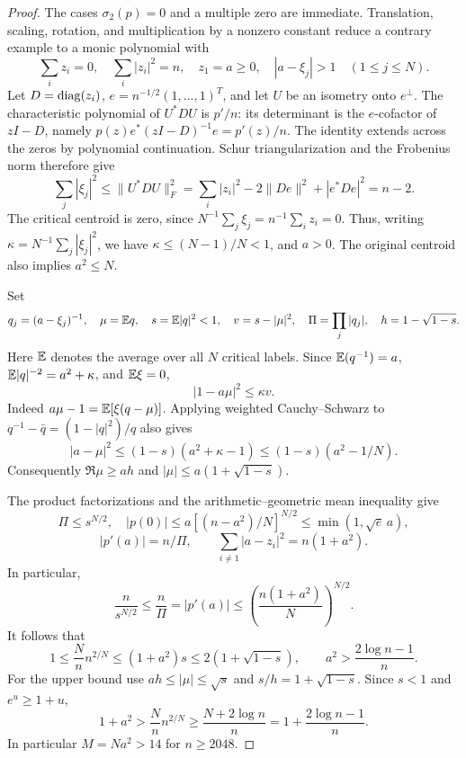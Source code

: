 \begin{proof}
The cases $\sigma_2(p)=0$ and a multiple zero are immediate.
Translation, scaling, rotation, and multiplication by a nonzero
constant reduce a contrary example to a monic polynomial with
\[
 \sum_i z_i=0,\quad \sum_i|z_i|^2=n,\quad z_1=a\ge0,
 \quad |a-\xi_j|>1\quad(1\le j\le N).
\]
Let $D=\operatorname{diag}(z_i)$, $e=n^{-1/2}(1,\ldots,1)^T$, and let $U$ be an
isometry onto $e^\perp$. The characteristic polynomial of $U^*DU$ is
$p'/n$: its determinant is the $e$-cofactor of $zI-D$, namely
$p(z)e^*(zI-D)^{-1}e=p'(z)/n$. The identity extends across the zeros
by polynomial continuation. Schur triangularization and the Frobenius
norm therefore give
\[
 \sum_j|\xi_j|^2\le\|U^*DU\|_F^2
 =\sum_i|z_i|^2-2\|De\|^2+|e^*De|^2=n-2.
\]
The critical centroid is zero, since
$N^{-1}\sum_j\xi_j=n^{-1}\sum_i z_i=0$. Thus, writing
$\kappa=N^{-1}\sum_j|\xi_j|^2$, we have
$\kappa\le(N-1)/N<1$, and $a>0$.
The original centroid also implies $a^2\le N$.

Set
\[
 q_j=(a-\xi_j)^{-1},\quad \mu=\mathbb E q,\quad
 s=\mathbb E|q|^2<1,\quad v=s-|\mu|^2,\quad
 \Pi=\prod_j|q_j|,\quad h=1-\sqrt{1-s}.
\]
Here $\mathbb E$ denotes the average over all $N$ critical labels. Since
$\mathbb E(q^{-1})=a$, $\mathbb E|q|^{-2}=a^2+\kappa$, and $\mathbb E\xi=0$,
\begin{equation}\label{ar:variance-covariance}
 |1-a\mu|^2\le\kappa v.
\end{equation}
Indeed $a\mu-1=\mathbb E[\xi(q-\mu)]$.  Applying weighted Cauchy--Schwarz
to $q^{-1}-\bar q=(1-|q|^2)/q$ also gives
\begin{equation}\label{ar:variance-weighted}
 |a-\mu|^2\le(1-s)(a^2+\kappa-1)
 \le(1-s)(a^2-1/N).
\end{equation}
Consequently $\Re\mu\ge ah$ and
$|\mu|\le a(1+\sqrt{1-s})$.

The product factorizations and the arithmetic--geometric mean
inequality give
\[
 \Pi\le s^{N/2},\quad
 |p(0)|\le a[(n-a^2)/N]^{N/2}\le\min(1,\sqrt e\,a),
\]
\[
 |p'(a)|=n/\Pi,\qquad
 \sum_{i\ne1}|a-z_i|^2=n(1+a^2).
\]
In particular,
\[
 \frac n{s^{N/2}}\le\frac n\Pi=|p'(a)|
 \le\left(\frac{n(1+a^2)}N\right)^{N/2}.
\]
It follows that
\begin{equation}\label{ar:variance-moment-range}
 1\le\frac Nn n^{2/N}\le(1+a^2)s
 \le2(1+\sqrt{1-s}),
 \qquad
 a^2>\frac{2\log n-1}{n}.
\end{equation}
For the upper bound use $ah\le|\mu|\le\sqrt s$ and
$s/h=1+\sqrt{1-s}$. Since $s<1$ and $e^u\ge1+u$,
\[
 1+a^2>\frac Nn n^{2/N}
 \ge\frac{N+2\log n}{n}
 =1+\frac{2\log n-1}{n}.
\]
In particular $M=Na^2>14$ for $n\ge2048$.


\end{proof}
